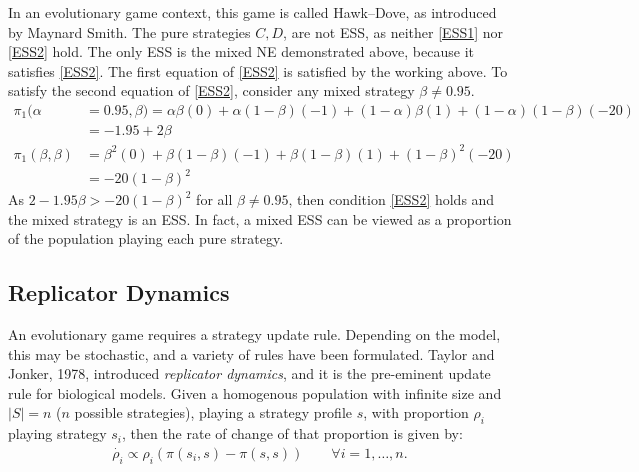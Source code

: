 In an evolutionary game context, this game is called Hawk--Dove, as introduced by Maynard Smith. The pure strategies $C,D$, are not ESS, as neither \eqref{ESS1} nor \eqref{ESS2} hold. The only ESS is the mixed NE demonstrated above, because it satisfies \eqref{ESS2}. The first equation of \eqref{ESS2} is satisfied by the working above. To satisfy the second equation of \eqref{ESS2}, consider any mixed strategy $\beta \neq 0.95$.  \\
\begin{align*}
    \pi_1(\alpha &= 0.95,\beta) = \alpha \beta (0) + \alpha(1-\beta)(-1)+ (1-\alpha)\beta(1) + (1-\alpha)(1-\beta)(-20) \\
    &= -1.95 + 2\beta\\
    \pi_1(\beta,\beta) &= \beta^2(0) + \beta(1-\beta)(-1) + \beta(1-\beta)(1) + (1-\beta)^2(-20)\\
    &= -20(1-\beta)^2
\end{align*}
As $2-1.95\beta> -20(1-\beta)^2$ for all $\beta \neq 0.95$, then condition \eqref{ESS2} holds and the mixed strategy is an ESS. In fact, a mixed ESS can be viewed as a proportion of the population playing each pure strategy.   \\



\subsection{Replicator Dynamics}
An evolutionary game requires a strategy update rule. Depending on the model, this may be stochastic, and a variety of rules have been formulated. Taylor and Jonker, 1978, introduced \emph{replicator dynamics}, and it is the pre-eminent update rule for biological models. Given a homogenous population with infinite size and $|S| = n$ ($n$ possible strategies), playing a strategy profile $s$, with proportion $\rho_i$ playing strategy $s_i$, then the rate of change of that proportion is given by: \\
\begin{align} \label{Replicator}
    \dot{\rho_i} \propto \rho_i(\pi(s_i, s) - \pi(s, s) ) \qquad\forall i = 1, \dots, n.
\end{align}


